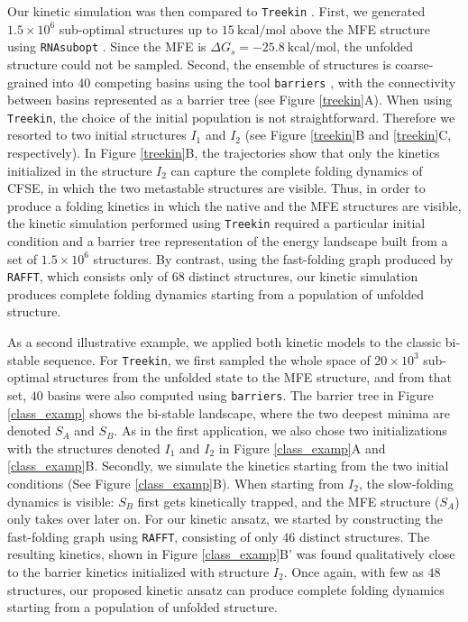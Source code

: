 Our kinetic simulation was then compared to \texttt{Treekin} \cite{flamm02_barrier_trees_degen_lands}. First, we generated \(1.5 \times 10^6\) sub-optimal structures up to $15 \ \textrm{kcal/mol}$ above the MFE structure using \texttt{RNAsubopt} \cite{lorenz11_vienn_packag}. Since the MFE is $\Delta G_s=-25.8 \ \textrm{kcal/mol}$, the unfolded structure could not be sampled. Second, the ensemble of structures is coarse-grained into $40$ competing basins using the tool \texttt{barriers} \cite{flamm02_barrier_trees_degen_lands}, with the connectivity between basins represented as a barrier tree (see Figure \ref{treekin}A). When using \texttt{Treekin}, the choice of the initial population is not straightforward. Therefore we resorted to two initial structures $I_1$ and $I_2$ (see Figure \ref{treekin}B and \ref{treekin}C, respectively). In Figure \ref{treekin}B, the trajectories show that only the kinetics initialized in the structure $I_2$ can capture the complete folding dynamics of CFSE, in which the two metastable structures are visible. Thus, in order to produce a folding kinetics in which the native and the MFE structures are visible, the kinetic simulation performed using \texttt{Treekin} required a particular initial condition and a barrier tree representation of the energy landscape built from a set of  $1.5 \times 10^6$ structures. By contrast, using the fast-folding graph produced by \texttt{RAFFT}, which consists only of $68$ distinct structures, our kinetic simulation produces complete folding dynamics starting from a population of unfolded structure.

As a second illustrative example, we applied both kinetic models to the classic bi-stable sequence. For \texttt{Treekin}, we first sampled the whole space of \(20 \times 10^3\) sub-optimal structures from the unfolded state to the MFE structure, and from that set, $40$ basins were also computed using \texttt{barriers}. The barrier tree in Figure \ref{class_examp} shows the bi-stable landscape, where the two deepest minima are denoted $S_A$ and $S_B$. As in the first application, we also chose two initializations with the structures denoted $I_1$ and $I_2$ in Figure \ref{class_examp}A and \ref{class_examp}B. Secondly, we simulate the kinetics starting from the two initial conditions (See Figure \ref{class_examp}B). When starting from $I_2$, the slow-folding dynamics is visible:  $S_B$ first gets kinetically trapped, and the MFE structure ($S_A$) only takes over later on. For our kinetic ansatz, we started by constructing the fast-folding graph using \texttt{RAFFT}, consisting of only $46$ distinct structures. The resulting kinetics, shown in Figure \ref{class_examp}B' was found qualitatively close to the barrier kinetics initialized with structure $I_2$. Once again, with few as $48$ structures, our proposed kinetic ansatz can produce complete folding dynamics starting from a population of unfolded structure.

